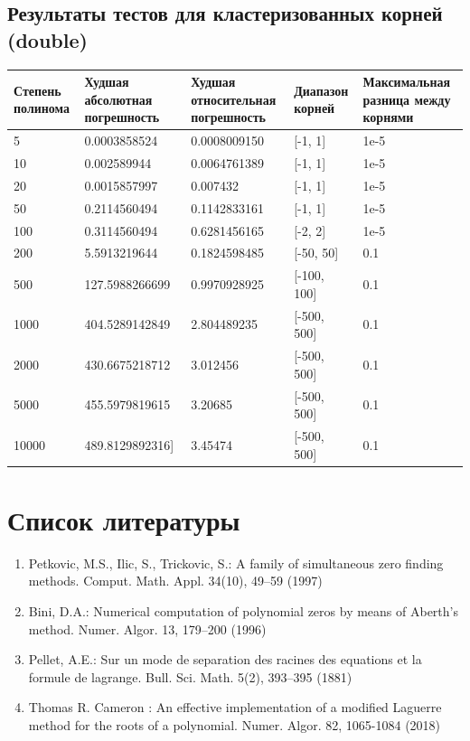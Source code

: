 \documentclass[a4paper,12pt]{article}
\begin{document}
\subsection{Результаты тестов для кластеризованных корней (double)}
\begin{center}
  \begin{tabular}{|p{3.0cm}|p{3.0cm}|p{3.0cm}|p{3.0cm}|p{3.0cm}|}
  \hline
  \textbf{Степень полинома}  &  \textbf{Худшая абсолютная погрешность} & \textbf{Худшая относительная погрешность} & \textbf{Диапазон корней} & \textbf{Максимальная разница между корнями}\\
  \hline
  5 & 0.0003858524 & 0.0008009150 & [-1, 1] & 1e-5\\
  \hline
  10 & 0.002589944 & 0.0064761389 & [-1, 1] & 1e-5\\
  \hline
  20 & 0.0015857997 & 0.007432 & [-1, 1] & 1e-5\\
  \hline
  50 & 0.2114560494 & 0.1142833161 & [-1, 1] & 1e-5\\
  \hline
  100 & 0.3114560494 & 0.6281456165 & [-2, 2] & 1e-5\\
  \hline
  200 & 5.5913219644 & 0.1824598485 & [-50, 50] & 0.1\\
  \hline
  500 & 127.5988266699 & 0.9970928925 & [-100, 100] & 0.1\\
  \hline
  1000 & 404.5289142849 & 2.804489235 & [-500, 500] & 0.1\\
  \hline
  2000 & 430.6675218712 & 3.012456 & [-500, 500] & 0.1\\
  \hline
  5000 & 455.5979819615 & 3.20685 & [-500, 500] & 0.1\\
  \hline
  10000 & 489.8129892316] & 3.45474 & [-500, 500] & 0.1\\
  \hline
\end{tabular}
\label{tab:my_label_2}
\end{center}

\newpage
\section{Список литературы}
\begin{enumerate}
    \item Petkovic, M.S., Ilic, S., Trickovic, S.: A family of simultaneous zero finding methods. Comput. Math. Appl. 34(10), 49–59 (1997)
    \item Bini, D.A.: Numerical computation of polynomial zeros by means of Aberth’s method. Numer. Algor. 13, 179–200 (1996)
    \item Pellet, A.E.: Sur un mode de separation des racines des equations et la formule de lagrange. Bull. Sci. Math. 5(2), 393–395 (1881)
    \item Thomas R. Cameron : An effective implementation of a modified Laguerre
    method for the roots of a polynomial. Numer. Algor. 82, 1065-1084 (2018)
\end{enumerate}
\end{document}
